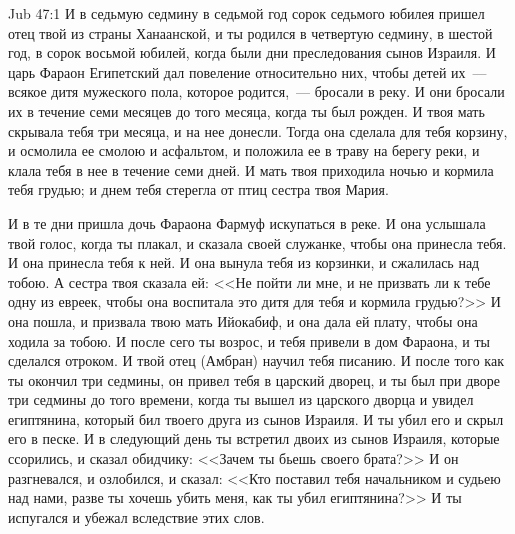 \vs Jub 47:1
И в седьмую седмину в седьмой год сорок
седьмого юбилея пришел отец твой из страны
Ханаанской, и ты родился в четвертую седмину, в
шестой год, в сорок восьмой юбилей, когда были дни
преследования сынов Израиля. И царь Фараон
Египетский дал повеление относительно них, чтобы
детей их~--- всякое дитя мужеского пола, которое
родится,~--- бросали в реку. И они бросали их в
течение семи месяцев до того месяца, когда ты был
рожден. И твоя мать скрывала тебя три месяца, и на
нее донесли. Тогда она сделала для тебя корзину, и
осмолила ее смолою и асфальтом, и положила ее в
траву на берегу реки, и клала тебя в нее в течение
семи дней. И мать твоя приходила ночью и кормила
тебя грудью; и днем тебя стерегла от птиц сестра
твоя Мария.

И в те дни пришла дочь Фараона Фармуф
искупаться в реке. И она услышала твой голос,
когда ты плакал, и сказала своей служанке, чтобы
она принесла тебя. И она принесла тебя к ней. И она
вынула тебя из корзинки, и сжалилась над тобою. А
сестра твоя сказала ей: <<Не пойти ли мне, и не
призвать ли к тебе одну из евреек, чтобы она
воспитала это дитя для тебя и кормила грудью?>>
И она пошла, и призвала твою мать Ийокабиф, и она
дала ей плату, чтобы она ходила за тобою. И после
сего ты возрос, и тебя привели в дом Фараона, и ты
сделался отроком. И твой отец (Амбран) научил тебя
писанию. И после того как ты окончил три седмины,
он привел тебя в царский дворец, и ты был при
дворе три седмины до того времени, когда ты вышел
из царского дворца и увидел египтянина, который
бил твоего друга из сынов Израиля. И ты убил его и
скрыл его в песке. И в следующий день ты встретил
двоих из сынов Израиля, которые ссорились, и
сказал обидчику: <<Зачем ты бьешь своего
брата?>> И он разгневался, и озлобился, и сказал:
<<Кто поставил тебя начальником и судьею над
нами, разве ты хочешь убить меня, как ты убил
египтянина?>> И ты испугался и убежал
вследствие этих слов.

